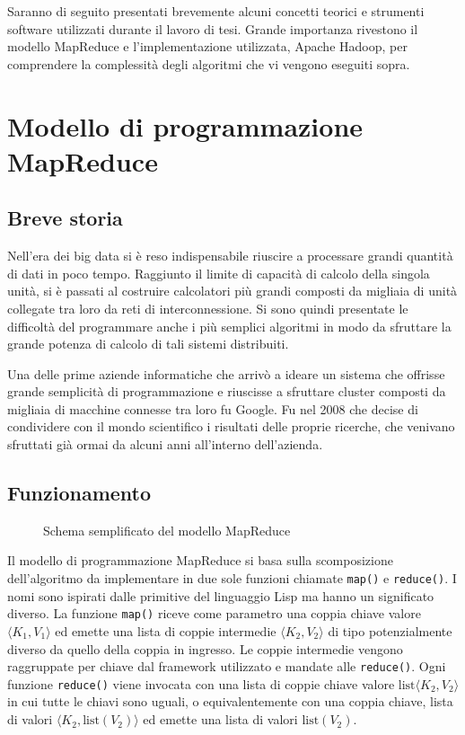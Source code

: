 \documentclass[a4paper,11pt,twoside,openright,fleqn]{book}
\newcommand{\code}[1]{\texttt{#1}}
\newcommand{\List}{\textrm{list}}
\newcommand{\pair}[2]{\langle #1, #2 \rangle}
\begin{document}
Saranno di seguito presentati brevemente alcuni concetti teorici e strumenti software utilizzati durante il lavoro di tesi. Grande importanza rivestono il modello MapReduce e l'implementazione utilizzata, Apache Hadoop, per comprendere la complessità degli algoritmi che vi vengono eseguiti sopra.

\section{Modello di programmazione MapReduce}

\subsection{Breve storia}

Nell'era dei big data si è reso indispensabile riuscire a processare grandi quantità di dati in poco tempo. Raggiunto il limite di capacità di calcolo della singola unità, si è passati al costruire calcolatori più grandi composti da migliaia di unità collegate tra loro da reti di interconnessione. Si sono quindi presentate le difficoltà del programmare anche i più semplici algoritmi in modo da sfruttare la grande potenza di calcolo di tali sistemi distribuiti.

Una delle prime aziende informatiche che arrivò a ideare un sistema che offrisse grande semplicità di programmazione e riuscisse a sfruttare cluster composti da migliaia di macchine connesse tra loro fu Google. Fu nel 2008 che decise di condividere con il mondo scientifico i risultati delle proprie ricerche, che venivano sfruttati già ormai da alcuni anni all'interno dell'azienda.

\subsection{Funzionamento}

\begin{figure}[ht] \centering

\label{fig:mapred}
\caption{Schema semplificato del modello MapReduce}
\end{figure}

Il modello di programmazione MapReduce \cite{Dean:2008} si basa sulla scomposizione dell'algoritmo da implementare in due sole funzioni chiamate \code{map()} e \code{reduce()}. I nomi sono ispirati dalle primitive del linguaggio Lisp ma hanno un significato diverso. La funzione \code{map()} riceve come parametro una coppia chiave valore $\pair{K_1}{V_1}$ ed emette una lista di coppie intermedie $\pair{K_2}{V_2}$ di tipo potenzialmente diverso da quello della coppia in ingresso. Le coppie intermedie vengono raggruppate per chiave dal framework utilizzato e mandate alle \code{reduce()}. Ogni funzione \code{reduce()} viene invocata con una lista di coppie chiave valore $\List\pair{K_2}{V_2}$ in cui tutte le chiavi sono uguali, o equivalentemente con una coppia chiave, lista di valori $\pair{K_2}{\List(V_2)}$ ed emette una lista di valori $\List(V_2)$.
\end{document}
